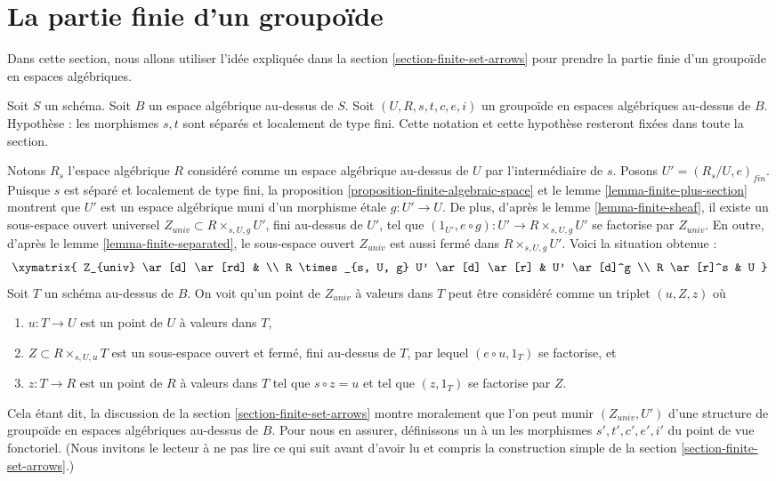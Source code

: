 \section{La partie finie d'un groupoïde}
\label{section-finite-part-groupoid}

\noindent
Dans cette section, nous allons utiliser l'idée expliquée dans
la section \ref{section-finite-set-arrows}
pour prendre la partie finie d'un groupoïde en espaces algébriques.

\medskip\noindent
Soit $S$ un schéma.
Soit $B$ un espace algébrique au-dessus de $S$.
Soit $(U, R, s, t, c, e, i)$ un groupoïde en espaces algébriques au-dessus de $B$.
Hypothèse : les morphismes $s, t$ sont séparés et localement de type fini.
Cette notation et cette hypothèse resteront fixées dans toute la section.

\medskip\noindent
Notons $R_s$ l'espace algébrique $R$ considéré comme un
espace algébrique au-dessus de $U$ par l'intermédiaire de $s$. Posons
$U' = (R_s/U, e)_{fin}$. Puisque $s$ est séparé et localement
de type fini, la
proposition \ref{proposition-finite-algebraic-space} et le
lemme \ref{lemma-finite-plus-section}
montrent que $U'$ est un espace algébrique muni d'un morphisme \'etale
$g : U' \to U$. De plus, d'après le
lemme \ref{lemma-finite-sheaf},
il existe un sous-espace ouvert universel
$Z_{univ} \subset R \times_{s, U, g} U'$, fini au-dessus de $U'$,
tel que $(1_{U'}, e \circ g) : U' \to R \times_{s, U, g} U'$
se factorise par $Z_{univ}$. En outre, d'après le
lemme \ref{lemma-finite-separated},
le sous-espace ouvert $Z_{univ}$ est aussi fermé dans
$R \times_{s, U, g} U'$. Voici la situation obtenue :
$$
\xymatrix{
Z_{univ} \ar[d] \ar[rd] & \\
R \times_{s, U, g} U' \ar[d] \ar[r] & U' \ar[d]^g \\
R \ar[r]^s & U
}
$$
Soit $T$ un schéma au-dessus de $B$. On voit qu'un point de
$Z_{univ}$ à valeurs dans $T$ peut être considéré comme un triplet
$(u, Z, z)$ où
\begin{enumerate}
\item $u : T \to U$ est un point de $U$ à valeurs dans $T$,
\item $Z \subset R \times_{s, U, u} T$ est un sous-espace ouvert et fermé,
fini au-dessus de $T$, par lequel $(e \circ u, 1_T)$ se factorise, et
\item $z : T \to R$ est un point de $R$ à valeurs dans $T$ tel que
$s \circ z = u$ et tel que $(z, 1_T)$ se factorise par $Z$.
\end{enumerate}
Cela étant dit, la discussion de la
section \ref{section-finite-set-arrows}
montre moralement que l'on peut munir $(Z_{univ}, U')$ d'une structure de
groupoïde en espaces algébriques au-dessus de $B$. Pour nous en assurer,
définissons un à un les morphismes $s', t', c', e', i'$ du point de vue
fonctoriel. (Nous invitons le lecteur à ne pas lire ce qui suit avant d'avoir
lu et compris la construction simple de la
section \ref{section-finite-set-arrows}.)

